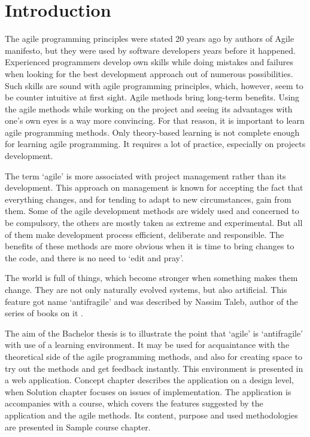 \chapter*{Introduction} %

The agile programming principles were stated 20 years ago by authors of Agile manifesto, but they were used by software developers years before it happened. Experienced programmers develop own skills while doing mistakes and failures when looking for the best development approach out of numerous possibilities. Such skills are sound with agile programming principles, which, however, seem to be counter intuitive at first sight. Agile methods bring long-term benefits. Using the agile methods while working on the project and seeing its advantages with one's own eyes is a way more convincing. For that reason, it is important to learn agile programming methods. Only theory-based learning is not complete enough for learning agile programming. It requires a lot of practice, especially on projects development.

The term `agile' is more associated with project management rather than its development. This approach on management is known for accepting the fact that everything changes, and for tending to adapt to new circumstances, gain from them. Some of the agile development methods are widely used and concerned to be compulsory, the others are mostly taken as extreme and experimental. But all of them make development process efficient, deliberate and responsible. The benefits of these methods are more obvious when it is time to bring changes to the code, and there is no need to `edit and pray'.

The world is full of things, which become stronger when something makes them change. They are not only naturally evolved systems, but also artificial. This feature got name `antifragile' and was described by Nassim Taleb, author of the series of books on it \cite{antifragile}.

The aim of the Bachelor thesis is to illustrate the point that `agile' is `antifragile' with use of a learning environment. It may be used for acquaintance with the theoretical side of the agile programming methods, and also for creating space to try out the methods and get feedback instantly. This environment is presented in a web application. Concept chapter describes the application on a design level, when Solution chapter focuses on issues of implementation. The application is accompanies with a course, which covers the features suggested by the application and the agile methods. Its content, purpose and used methodologies are presented in Sample course chapter.
